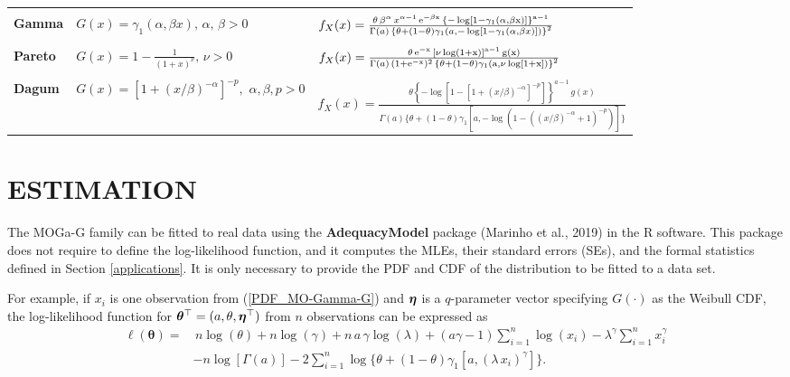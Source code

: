 \documentclass[twoside,leqno,11pt]{article}
\newcommand{\etn}{{\mbox{\boldmath $\eta$}}}
\begin{document}
\begin{table}[H]
{\begin{tabular}{l|l|l}
{} & {} & {} \\
\hline
{} & {} & {} \\
\textbf{Gamma} &  $G(x)=\gamma_1(\alpha,\beta x),\,\alpha,\,\beta>0$ & $f_{X}(x)=\frac{\theta\,\beta^{\alpha}\,x^{\alpha-1}\,\rm{e}^{-\beta x}\,\left\{ -\log[1-\gamma_1(\alpha,\beta x)] \right\}^{a-1}}{\Gamma(a)\,\left\{\theta+(1-\theta)\gamma_1\left( a, -\log \left[1-\gamma_1(\alpha,\beta x)\right]\right)\right\}^{2}}$ \\
{} & {} & {} \\                                                                                                                                                                          \hline
\textbf{Pareto} &  $G(x)=1-\frac{1}{(1+x)^\nu},\,\nu>0$ & $f_{X}(x)=\frac{\theta \, \rm{e}^{-x}\, \left[\nu\log(1+x)\right]^{a-1}\, g(x)}{\Gamma(a)\,(1+\rm{e}^{-x})^2\,\left\{\theta+(1-\theta)\gamma_1\left( a, \nu\log[1+x]\right)\right\}^{2}}$\\
{} & {} & {} \\
\hline
\textbf{Dagum} & $G(x) = [1 + (x/\beta) ^ {-\alpha}] ^ {-p},\,\, \alpha, \beta, p > 0$ & $f_X(x) = \frac{\theta  \left\{ -\log[1-[1 + (x/\beta) ^ {-\alpha}] ^ {-p}] \right\}^{a-1}\, g(x)}{\Gamma(a)\{\theta + (1 - \theta)\gamma_1[a, -\log   (1-((x/\beta)^{-\alpha}+1)^{-p})]\}}$ \\
\hline
\end{tabular}}
\end{table}

\section{ESTIMATION}\label{estimation}

The MOGa-G family can be fitted to real data using the {\bf AdequacyModel} package (Marinho et al., 2019)  \cite{Marinho} in the {\sf R} software. This packa\-ge does not require to  define the log-likelihood function, and it computes the MLEs,  their standard errors (SEs), and the formal statistics defined  in Section \ref{applications}. It is only necessary to provide the PDF and CDF of the distribution to be fitted to a data set.

For example, if $x_i$ is one observation from (\ref{PDF_MO-Gamma-G}) and $\etn$ is a $q$-parameter vector specifying $G(\cdot)$ as the Weibull CDF, the log-likelihood function for $\boldsymbol{\theta}^\top=(a,\theta,\etn^\top)$ from $n$ observations can be expressed as 
\begin{align}\label{loglik}
\ell (\boldsymbol{\theta})=&\,n\log (\theta)+n\log(\gamma)+n\, a\, \gamma \log(\lambda)+(a\gamma-1)\sum_{i=1}^n{\log(x_i)}-\lambda^\gamma\sum_{i=1}^n x_i^\gamma\nonumber \\ &
-n\log[\Gamma(a)]-2\sum_{i=1}^n{\log\{\theta+(1-\theta)\gamma_1[a,(\lambda\,x_i)^\gamma]\}}.
\end{align}
\end{document}
